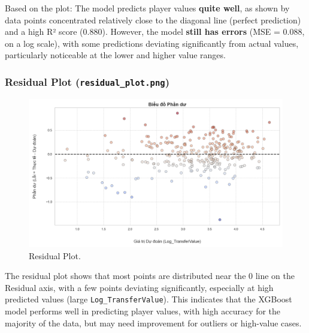 \documentclass[12pt, a4paper]{report}
\begin{document}
Based on the plot: The model predicts player values \textbf{quite well}, as shown by data points concentrated relatively close to the diagonal line (perfect prediction) and a high R² score (0.880).
However, the model \textbf{still has errors} (MSE = 0.088, on a log scale), with some predictions deviating significantly from actual values, particularly noticeable at the lower and higher value ranges.

\subsubsection*{Residual Plot (\texttt{residual\_plot.png})}
\begin{figure}[H]
    \centering
    \includegraphics[width=\textwidth]{residual_plot.png}
    \caption{Residual Plot.}
    \label{fig:residual_plot}
\end{figure}

The residual plot shows that most points are distributed near the 0 line on the Residual axis, with a few points deviating significantly, especially at high predicted values (large \texttt{Log\_TransferValue}).
This indicates that the XGBoost model performs well in predicting player values, with high accuracy for the majority of the data, but may need improvement for outliers or high-value cases.
\end{document}
